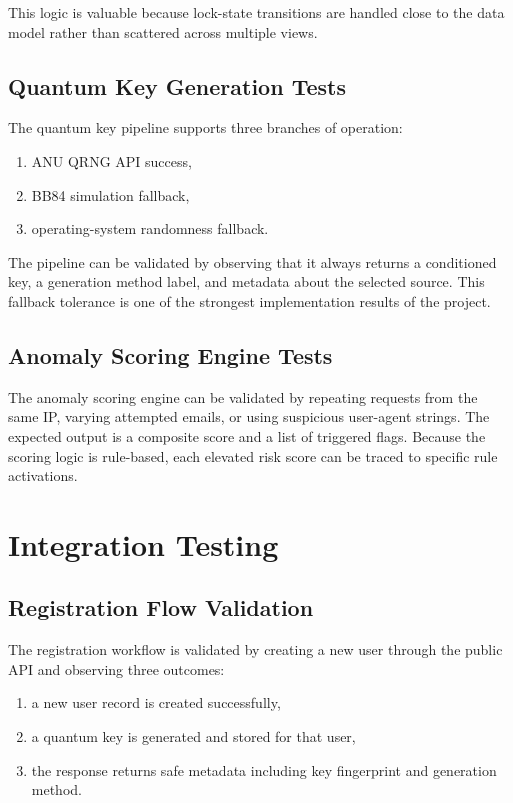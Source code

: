 \documentclass[12pt,a4paper]{report}
\begin{document}
This logic is valuable because lock-state transitions are handled close to the data model rather than scattered across multiple views.

\subsection{Quantum Key Generation Tests}
The quantum key pipeline supports three branches of operation:

\begin{enumerate}
    \item ANU QRNG API success,
    \item BB84 simulation fallback,
    \item operating-system randomness fallback.
\end{enumerate}

The pipeline can be validated by observing that it always returns a conditioned key, a generation method label, and metadata about the selected source. This fallback tolerance is one of the strongest implementation results of the project.

\subsection{Anomaly Scoring Engine Tests}
The anomaly scoring engine can be validated by repeating requests from the same IP, varying attempted emails, or using suspicious user-agent strings. The expected output is a composite score and a list of triggered flags. Because the scoring logic is rule-based, each elevated risk score can be traced to specific rule activations.

\section{Integration Testing}

\subsection{Registration Flow Validation}
The registration workflow is validated by creating a new user through the public API and observing three outcomes:

\begin{enumerate}
    \item a new user record is created successfully,
    \item a quantum key is generated and stored for that user,
    \item the response returns safe metadata including key fingerprint and generation method.
\end{enumerate}
\end{document}
